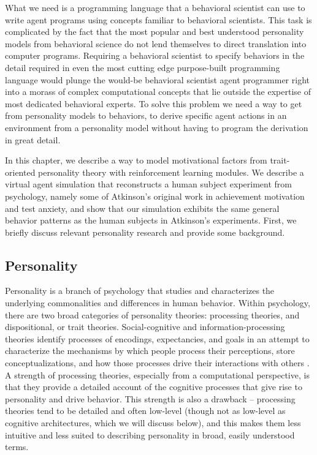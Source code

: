 What we need is a programming language that a behavioral scientist can use to write agent programs using concepts familiar to behavioral scientists.  This task is complicated by the fact that the most popular and best understood personality models from behavioral science do not lend themselves to direct translation into computer programs.  Requiring a behavioral scientist to specify behaviors in the detail required in even the most cutting edge purpose-built programming language would plunge the would-be behavioral scientist agent programmer right into a morass of complex computational concepts that lie outside the expertise of most dedicated behavioral experts. To solve this problem we need a way to get from personality models to behaviors, to derive specific agent actions in an environment from a personality model without having to program the derivation in great detail.

In this chapter, we describe a way to model motivational factors from trait-oriented personality theory with reinforcement learning modules.  We describe a virtual agent simulation that reconstructs a human subject experiment from psychology, namely some of Atkinson's original work in achievement motivation and test anxiety, and show that our simulation exhibits the same general behavior patterns as the human subjects in Atkinson's experiments.  First, we briefly discuss relevant personality research and provide some background.

\subsection{Personality}

Personality is a branch of psychology that studies and characterizes the underlying commonalities and differences in human behavior. Within psychology, there are two broad categories of personality theories: processing theories, and dispositional, or trait theories. Social-cognitive and information-processing theories identify processes of encodings, expectancies, and goals in an attempt to characterize the mechanisms by which people process their perceptions, store conceptualizations, and how those processes drive their interactions with others \cite{dweck1988a-social-cognitive,cervone2009personality,cervone1999the-coherence}. A strength of processing theories, especially from a computational perspective, is that they provide a detailed account of the cognitive processes that give rise to personality and drive behavior.  This strength is also a drawback -- processing theories tend to be detailed and often low-level (though not as low-level as cognitive architectures, which we will discuss below), and this makes them less intuitive and less suited to describing personality in broad, easily understood terms.

